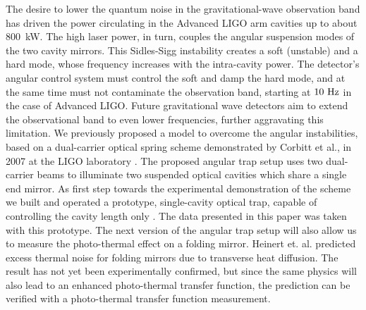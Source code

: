 The desire to lower the quantum noise in the gravitational-wave observation band has driven the power circulating in the Advanced LIGO arm cavities up to about 800~kW. 
The high laser power, in turn, couples the angular suspension modes of the two cavity mirrors. This Sidles-Sigg instability \cite{Sidles06} creates a soft (unstable) and a hard mode, whose frequency increases with the intra-cavity power. The detector's angular control system must control the soft and damp the hard mode, and at the same time must not contaminate the observation band, starting at $10~{\rm Hz}$ in the case of Advanced LIGO. 
Future gravitational wave detectors aim to extend the observational band to even lower frequencies, further aggravating this limitation.
We previously proposed a model \cite{Perreca14}  to overcome the angular instabilities, based on a dual-carrier optical spring scheme demonstrated by Corbitt et al., in 2007 at the LIGO laboratory \cite{Corbitt07}.
The proposed angular trap setup uses two dual-carrier beams to illuminate two suspended optical cavities which share a single end mirror. %
As first step towards the experimental demonstration of  the scheme we built and operated a prototype, single-cavity optical trap, capable of controlling the cavity length only \cite{LoughThesis}. The data presented in this paper was taken with this prototype.
The next version of the angular trap setup will also allow us to measure the photo-thermal effect on a folding mirror. Heinert et. al. \cite{PhysRevD.90.042001}  predicted excess thermal noise for folding mirrors due to transverse heat diffusion.
The result has not yet been experimentally confirmed, but since the same physics will also lead to an enhanced photo-thermal transfer function, 
the prediction can be verified with a photo-thermal transfer function measurement.


